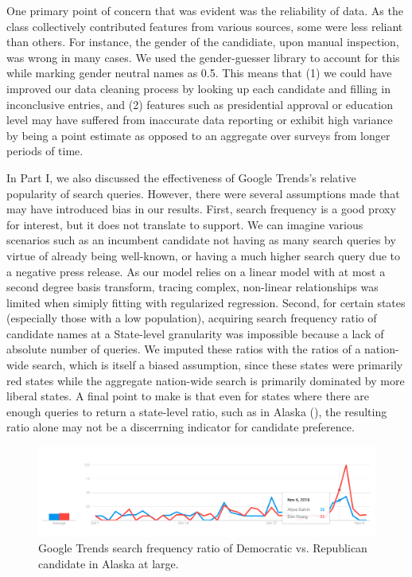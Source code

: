 \documentclass[12pt, letterpaper]{article}
\begin{document}
One primary point of concern that was evident was the reliability of data. As the class collectively contributed features from various sources, some were less reliant than others. For instance, the gender of the candidiate, upon manual inspection, was wrong in many cases. We used the gender-guesser library to account for this while marking gender neutral names as 0.5. This means that (1) we could have improved our data cleaning process by looking up each candidate and filling in inconclusive entries, and (2) features such as presidential approval or education level may have suffered from inaccurate data reporting or exhibit high variance by being a point estimate as opposed to an aggregate over surveys from longer periods of time.

In Part I, we also discussed the effectiveness of Google Trends's relative popularity of search queries. However, there were several assumptions made that may have introduced bias in our results. First, search frequency is a good proxy for interest, but it does not translate to support. We can imagine various scenarios such as an incumbent candidate not having as many search queries by virtue of already being well-known, or having a much higher search query due to a negative press release. As our model relies on a linear model with at most a second degree basis transform, tracing complex, non-linear relationships was limited when simiply fitting with regularized regression. Second, for certain states (especially those with a low population), acquiring search frequency ratio of candidate names at a State-level granularity was impossible because a lack of absolute number of queries. We imputed these ratios with the ratios of a nation-wide search, which is itself a biased assumption, since these states were primarily red states while the aggregate nation-wide search is primarily dominated by more liberal states. A final point to make is that even for states where there are enough queries to return a state-level ratio, such as in Alaska (), the resulting ratio alone may not be a discerrning indicator for candidate preference.

\begin{figure}[tbh]
  \centering
  \includegraphics[scale=0.4]{alaska_candidate}
  \caption{Google Trends search frequency ratio of Democratic vs. Republican candidate in Alaska at large.}
  \label{fig:candidate_only}
\end{figure}
\end{document}
